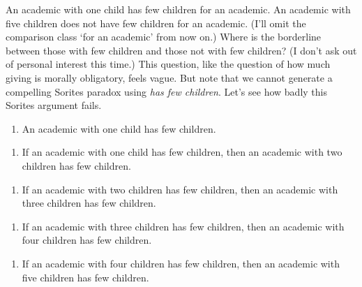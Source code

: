 \documentclass[
  11pt,
  letterpaper,
  DIV=11,
  numbers=noendperiod,
  twoside]{scrartcl}
\providecommand{\tightlist}{%
  \setlength{\itemsep}{0pt}\setlength{\parskip}{0pt}}
\begin{document}
An academic with one child has few children for an academic. An academic
with five children does not have few children for an academic. (I'll
omit the comparison class `for an academic' from now on.) Where is the
borderline between those with few children and those not with few
children? (I don't ask out of personal interest this time.) This
question, like the question of how much giving is morally obligatory,
feels vague. But note that we cannot generate a compelling Sorites
paradox using \emph{has few children}. Let's see how badly this Sorites
argument fails.

\begin{description}
\tightlist
\item[(2)]
\hfill
\begin{enumerate}
\def\labelenumi{(\alph{enumi})}
\tightlist
\item
  An academic with one child has few children.
\end{enumerate}

\begin{enumerate}
\def\labelenumi{(\alph{enumi})}
\setcounter{enumi}{1}
\tightlist
\item
  If an academic with one child has few children, then an academic with
  two children has few children.
\end{enumerate}

\begin{enumerate}
\def\labelenumi{(\alph{enumi})}
\setcounter{enumi}{2}
\tightlist
\item
  If an academic with two children has few children, then an academic
  with three children has few children.
\end{enumerate}

\begin{enumerate}
\def\labelenumi{(\alph{enumi})}
\setcounter{enumi}{3}
\tightlist
\item
  If an academic with three children has few children, then an academic
  with four children has few children.
\end{enumerate}

\begin{enumerate}
\def\labelenumi{(\alph{enumi})}
\setcounter{enumi}{4}
\tightlist
\item
  If an academic with four children has few children, then an academic
  with five children has few children.
\end{enumerate}
\end{description}
\end{document}
